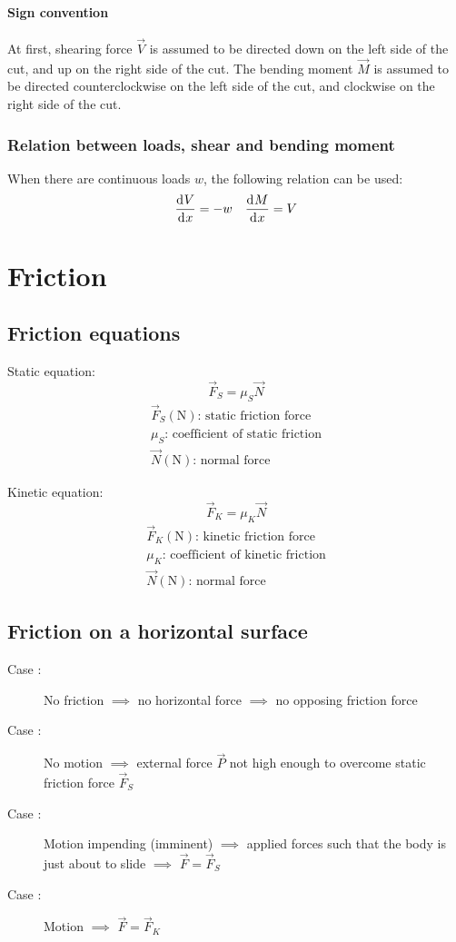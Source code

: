 \documentclass[10pt, twocolumn]{article}
\begin{document}
\paragraph*{Sign convention}
At first, shearing force \(\vec{V}\) is assumed to be directed down on the left side of the cut, and up on the right side of the cut.
The bending moment \(\vec{M}\) is assumed to be directed counterclockwise on the left side of the cut, and clockwise on the right side of the cut.

\subsubsection{Relation between loads, shear and bending moment}
When there are continuous loads \(w\), the following relation can be used:
\begin{align*}
  \frac{\mathrm{d}^{} V}{\mathrm{d}^{} x} = - w &  & \frac{\mathrm{d}^{} M}{\mathrm{d}^{} x} = V
\end{align*}

\section{Friction}
\subsection{Friction equations}
Static equation:
\[
  \vec{F}_S = \mu_S \vec{N}
\]
\[
  \begin{array}{|l}
    \vec{F}_S (\si{\newton}) \text{: static friction force} \\
    \mu_S \text{: coefficient of static friction}           \\
    \vec{N} (\si{\newton}) \text{: normal force}
  \end{array}
\]

Kinetic equation:
\[
  \vec{F}_K = \mu_K \vec{N}
\]
\[
  \begin{array}{|l}
    \vec{F}_K (\si{\newton}) \text{: kinetic friction force} \\
    \mu_K \text{: coefficient of kinetic friction}           \\
    \vec{N} (\si{\newton}) \text{: normal force}
  \end{array}
\]

\subsection{Friction on a horizontal surface}
\begin{description}
  \item[Case :] No friction \(\implies\) no horizontal force \(\implies\) no opposing friction force
  \item[Case :] No motion \(\implies\) external force \(\vec{P}\) not high enough to overcome static friction force \(\vec{F}_S\)
  \item[Case :] Motion impending (imminent) \(\implies\) applied forces such that the body is just about to slide \(\implies\) \(\vec{F} = \vec{F}_S\)
  \item[Case :] Motion \(\implies\) \(\vec{F} = \vec{F}_K\)
\end{description}
\end{document}
